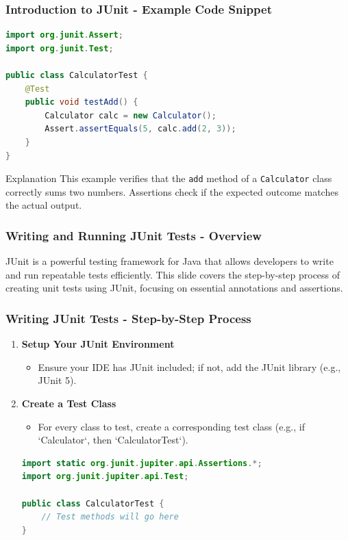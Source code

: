 \documentclass{beamer}
\begin{document}
\begin{frame}[fragile]
    \frametitle{Introduction to JUnit - Example Code Snippet}
    \begin{lstlisting}[language=Java]
import org.junit.Assert;
import org.junit.Test;

public class CalculatorTest {
    @Test
    public void testAdd() {
        Calculator calc = new Calculator();
        Assert.assertEquals(5, calc.add(2, 3));
    }
}
    \end{lstlisting}
    \begin{block}{Explanation}
        This example verifies that the \texttt{add} method of a \texttt{Calculator} class correctly sums two numbers.
        Assertions check if the expected outcome matches the actual output.
    \end{block}
\end{frame}

\begin{frame}[fragile]
    \frametitle{Writing and Running JUnit Tests - Overview}
    JUnit is a powerful testing framework for Java that allows developers to write and run repeatable tests efficiently. 
    This slide covers the step-by-step process of creating unit tests using JUnit, focusing on essential annotations and assertions.
\end{frame}

\begin{frame}[fragile]
    \frametitle{Writing JUnit Tests - Step-by-Step Process}
    \begin{enumerate}
        \item \textbf{Setup Your JUnit Environment}
        \begin{itemize}
            \item Ensure your IDE has JUnit included; if not, add the JUnit library (e.g., JUnit 5).
        \end{itemize}
        
        \item \textbf{Create a Test Class}
        \begin{itemize}
            \item For every class to test, create a corresponding test class (e.g., if `Calculator`, then `CalculatorTest`).
        \end{itemize}
        
        \begin{lstlisting}[language=Java]
import static org.junit.jupiter.api.Assertions.*;
import org.junit.jupiter.api.Test;

public class CalculatorTest {
    // Test methods will go here
}
        \end{lstlisting}
    \end{enumerate}
\end{frame}
\end{document}

